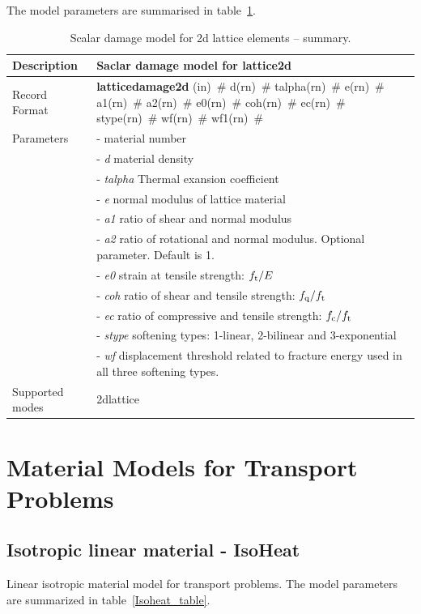 \documentclass[a4paper]{article}
\newcommand{\descitem}[1]{{\noindent \bf #1}}
\newcommand{\elemparam}[2]{{{#1\tiny (#2)}~\#}}
\newcommand{\param}[1]{{\it #1}}
\begin{document}
The model parameters are summarised in table~\ref{latticedamage2d_table}.
\begin{table}[!htb]
\begin{tabular}{|l|p{9cm}|}
\hline
Description & Saclar damage model for lattice2d \\
\hline
Record Format & \descitem{latticedamage2d} \elemparam{}{in} 
\elemparam{d}{rn} \elemparam{talpha}{rn} \elemparam{e}{rn} \elemparam{a1}{rn} \elemparam{a2}{rn} \elemparam{e0}{rn}  \elemparam{coh}{rn} \elemparam{ec}{rn} \elemparam{stype}{rn} \elemparam{wf}{rn} \elemparam{wf1}{rn} \\
Parameters &- \param{} material number\\
&- \param{d} material density\\
&- \param{talpha} Thermal exansion coefficient\\
&- \param{e} normal modulus of lattice material\\
&- \param{a1} ratio of shear and normal modulus\\
&- \param{a2} ratio of rotational and normal modulus. Optional parameter. Default is 1.\\
&- \param{e0} strain at tensile strength: $f_{\rm t}/E$\\
&- \param{coh} ratio of shear and tensile strength: $f_{\rm q}/f_{\rm t}$\\
&- \param{ec} ratio of compressive and tensile strength: $f_{\rm c}/f_{\rm t}$\\
&- \param{stype} softening types: 1-linear, 2-bilinear and 3-exponential\\
&- \param{wf} displacement threshold related to fracture energy used in all three softening types.\\

Supported modes& 2dlattice\\
\hline
\end{tabular}
\caption{Scalar damage model for 2d lattice elements -- summary.}
\label{latticedamage2d_table}
\end{table}

\clearpage

\section{Material Models for Transport Problems}
\subsection{Isotropic linear material - IsoHeat}
\label{IsoLET}
Linear isotropic material model for transport problems. The model parameters are summarized
in table~\ref{Isoheat_table}.
\end{document}
